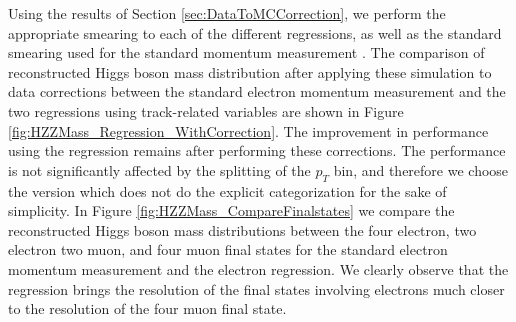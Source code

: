 \documentclass{cmspaper}
\begin{document}
Using the results of Section \ref{sec:DataToMCCorrection}, we perform the appropriate smearing to
each of the different regressions, as well as the standard smearing used for the standard 
momentum measurement \cite{HZZICHEPCMSNote}. The comparison of reconstructed Higgs boson mass distribution
after applying these simulation to data corrections between the standard electron momentum
measurement and the two regressions using track-related variables are shown in 
Figure \ref{fig:HZZMass_Regression_WithCorrection}. The improvement 
in performance using the regression remains after performing these corrections. The performance
is not significantly affected by the splitting of the $p_{T}$ bin, and therefore we choose the
version which does not do the explicit categorization for the sake of simplicity. 
In Figure \ref{fig:HZZMass_CompareFinalstates} we compare the reconstructed Higgs boson
mass distributions between the four electron, two electron two muon, and four muon final states
for the standard electron momentum measurement and the electron regression. We clearly observe
that the regression brings the resolution of the final states involving electrons much closer
to the resolution of the four muon final state. 
\end{document}
